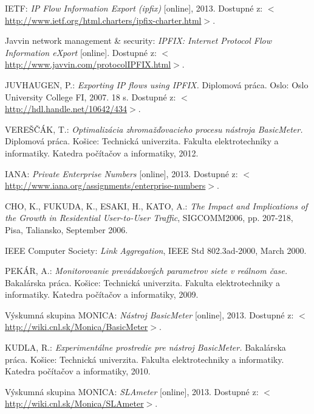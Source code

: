 \begin{thebibliography}{999}
IETF: \emph{IP Flow Information Export (ipfix)} [online], 2013. Dostupné 
z: $<$\url{http://www.ietf.org/html.charters/ipfix-charter.html}$>$.

Javvin network management \& security: \emph{IPFIX: Internet Protocol Flow Information eXport} [online]. Dostupné 
z: $<$\url{http://www.javvin.com/protocolIPFIX.html}$>$.

JUVHAUGEN, P.: \emph{Exporting IP flows using IPFIX.} 
Diplomová práca. Oslo: Oslo University College FI, 2007. 18 s. Dostupné 
z: $<$\url{http://hdl.handle.net/10642/434}$>$.

VEREŠČÁK, T.: \emph{Optimalizácia zhromažďovacieho procesu nástroja BasicMeter.} 
Diplomová práca. Košice: Technická univerzita. Fakulta elektrotechniky a informatiky. 
Katedra počítačov a informatiky, 2012.

IANA: \emph{Private Enterprise Numbers} [online], 2013. Dostupné 
z: $<$\url{http://www.iana.org/assignments/enterprise-numbers}$>$.

CHO, K., FUKUDA, K., ESAKI, H., KATO, A.: \emph{The Impact and Implications of the Growth in Residential
User-to-User Traffic}, SIGCOMM2006, pp. 207-218, Pisa, Taliansko, September 2006.

IEEE Computer Society: \emph{Link Aggregation}, IEEE Std 802.3ad-2000, March 2000.

PEKÁR, A.: \emph{Monitorovanie prevádzkových parametrov siete v reálnom čase.} 
Bakalárska práca. Košice: Technická univerzita. Fakulta elektrotechniky a informatiky. 
Katedra počítačov a informatiky, 2009.

Výskumná skupina MONICA: \emph{Nástroj BasicMeter} [online], 2013. 
Dostupné z: $<$\url{http://wiki.cnl.sk/Monica/BasicMeter}$>$.

KUDLA, R.: \emph{Experimentálne prostredie pre nástroj BasicMeter.} 
Bakalárska práca. Košice: Technická univerzita. Fakulta elektrotechniky a informatiky. 
Katedra počítačov a informatiky, 2010.

Výskumná skupina MONICA: \emph{SLAmeter} [online], 2013. 
Dostupné z: $<$\url{http://wiki.cnl.sk/Monica/SLAmeter}$>$.


\end{thebibliography}
